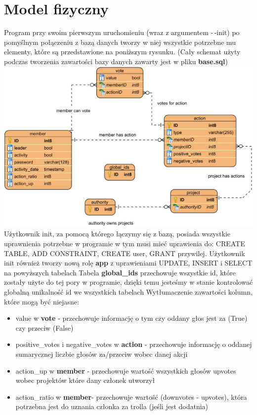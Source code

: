 \documentclass{article}
\begin{document}
\newpage
\section{Model fizyczny}
Program przy swoim pierwszym uruchomieniu (wraz z argumentem -\,-init) po pomyślnym połączeniu z bazą danych
tworzy w niej wszystkie potrzebne mu elementy, które są przedstawione na poniższym rysunku. \newline
(Cały schemat użyty podczas tworzenia zawartości bazy danych zawarty jest w pliku \textbf{base.sql})
\includegraphics[scale=0.303]{base}  \newline
Użytkownik init, za pomocą którego łączymy się z bazą, posiada wszystkie uprawnienia potrzebne w programie w tym musi mieć uprawienia do: CREATE TABLE, ADD CONSTRAINT, CREATE user, GRANT {przywilej}.
Użytkownik init również tworzy nową rolę \textbf{app} z uprawieniami UPDATE, INSERT i SELECT na powyższych tabelach \newline  \newline 
Tabela\textbf{ global\_ids} przechowuje wszystkie id, które zostały użyte do tej pory w programie, dzięki temu jesteśmy w stanie kontrolować globalną unikalność id we wszystkich tabelach \newline
Wytłumaczenie zawartości kolumn, które mogą być niejasne:
\begin{itemize}
\item value w \textbf{vote} - przechowuje informację o tym czy oddany głos jest za (True) czy przeciw (False)
\item positive\_votes i negative\_votes w \textbf{action} - przechowuje informację o oddanej sumarycznej liczbie głosów za/przeciw wobec danej akcji
\item action\_up w \textbf{member} - przechowuje wartość wszystkich głosów upvotes wobec projektów które dany członek utworzył
\item action\_ratio w \textbf{member}- przechowuje wartość (downvotes - upvotes), która potrzebna jest do uznania członka za trolla (jeśli jest dodatnia)
\end{itemize}
\end{document}
